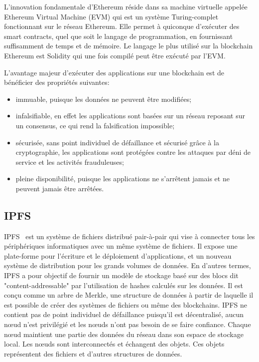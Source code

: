 \documentclass{tnreport}
\begin{document}
L'innovation fondamentale d'Ethereum réside dans sa machine virtuelle appelée Ethereum Virtual Machine (EVM) qui est un système Turing-complet fonctionnant sur le réseau Ethereum. Elle permet à quiconque d'exécuter des smart contracts, quel que soit le langage de programmation, en fournissant suffisamment de temps et de mémoire. Le langage le plus utilisé sur la blockchain Ethereum est Solidity qui une fois compilé peut être exécuté par l'EVM.

L'avantage majeur d'exécuter des applications sur une blockchain est de bénéficier des propriétés suivantes:
\begin{itemize}
	\item immuable, puisque les données ne peuvent être modifiées;
	\item infalsifiable, en effet les applications sont basées sur un réseau reposant sur un consensus, ce qui rend la falsification impossible;
	\item sécurisée, sans point individuel de défaillance et sécurisé grâce à la cryptographie, les applications sont protégées contre les attaques par déni de service et les activités frauduleuses;
	\item pleine disponibilité, puisque les applications ne s'arrêtent jamais et ne peuvent jamais être arrêtées.
\end{itemize}

\subsection{IPFS}

IPFS~\cite{ipfs-paper} est un système de fichiers distribué pair-à-pair qui vise à connecter tous les périphériques informatiques avec un même système de fichiers. Il expose une plate-forme pour l'écriture et le déploiement d'applications, et un nouveau système de distribution pour les grands volumes de données. 
En d'autres termes, IPFS a pour objectif de fournir un modèle de stockage basé sur des blocs dit "content-addressable" par l'utilisation de hashes calculés sur les données. Il est conçu comme un arbre de Merkle, une structure de données à partir de laquelle il est possible de créer des systèmes de fichiers ou même des blockchains. IPFS ne contient pas de point individuel de défaillance puisqu'il est décentralisé, aucun nœud n'est privilégié et les nœuds n'ont pas besoin de se faire confiance. 
Chaque nœud maintient une partie des données du réseau dans son espace de stockage local. 
Les nœuds sont interconnectés et échangent des objets. Ces objets représentent des fichiers et d'autres structures de données.
\end{document}

